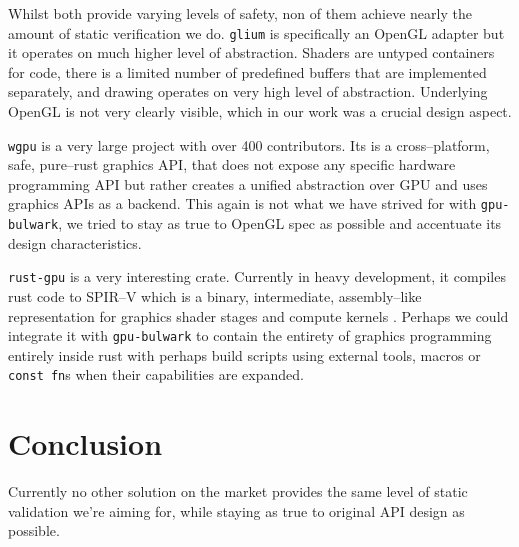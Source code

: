 Whilst both provide varying levels of safety, non of them achieve nearly the amount of static verification we do.
\texttt{glium} is specifically an OpenGL adapter but it operates on much higher level of abstraction.
Shaders are untyped containers for code, there is a limited number of predefined buffers that are implemented separately, 
and drawing operates on very high level of abstraction. 
Underlying OpenGL is not very clearly visible, which in our work was a crucial design aspect.

\texttt{wgpu} is a very large project with over 400 contributors. Its is a cross--platform, safe, pure--rust graphics API, that
does not expose any specific hardware programming API but rather creates a unified abstraction over GPU and uses graphics APIs 
as a backend.
This again is not what we have strived for with \texttt{gpu-bulwark}, we tried to stay as true to OpenGL spec as possible
and accentuate its design characteristics.

\texttt{rust-gpu} is a very interesting crate. Currently in heavy development, it compiles rust code to SPIR--V which is a binary, intermediate, 
assembly--like representation for graphics shader stages and compute kernels \cite{spirvspec}.
Perhaps we could integrate it with \texttt{gpu-bulwark} to contain the entirety of graphics programming entirely inside rust 
with perhaps build scripts using external tools, macros or \texttt{const fn}s when their capabilities are expanded.

\section{Conclusion}

Currently no other solution on the market provides the same level of static validation we're aiming for, while staying as true to original API design as possible.
